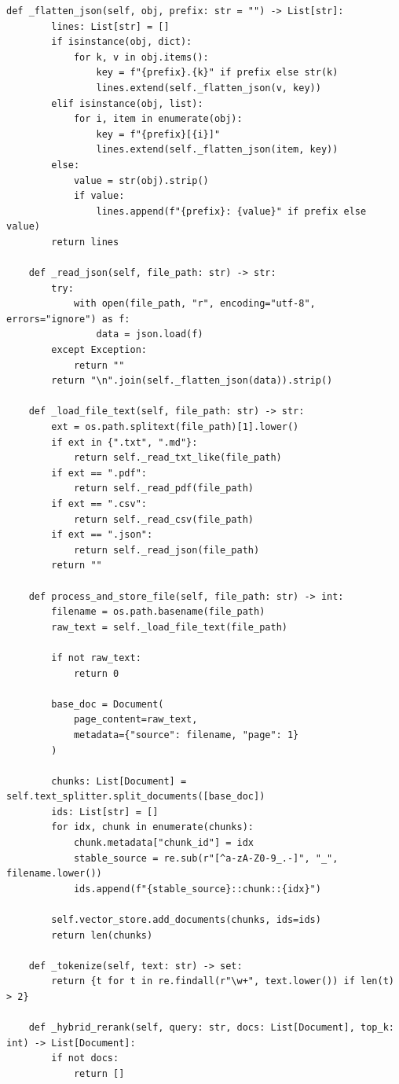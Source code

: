 \documentclass[12pt,a4paper]{article}
\begin{document}
\begin{lstlisting}[caption={database.py}]
    def _flatten_json(self, obj, prefix: str = "") -> List[str]:
        lines: List[str] = []
        if isinstance(obj, dict):
            for k, v in obj.items():
                key = f"{prefix}.{k}" if prefix else str(k)
                lines.extend(self._flatten_json(v, key))
        elif isinstance(obj, list):
            for i, item in enumerate(obj):
                key = f"{prefix}[{i}]"
                lines.extend(self._flatten_json(item, key))
        else:
            value = str(obj).strip()
            if value:
                lines.append(f"{prefix}: {value}" if prefix else value)
        return lines

    def _read_json(self, file_path: str) -> str:
        try:
            with open(file_path, "r", encoding="utf-8", errors="ignore") as f:
                data = json.load(f)
        except Exception:
            return ""
        return "\n".join(self._flatten_json(data)).strip()

    def _load_file_text(self, file_path: str) -> str:
        ext = os.path.splitext(file_path)[1].lower()
        if ext in {".txt", ".md"}:
            return self._read_txt_like(file_path)
        if ext == ".pdf":
            return self._read_pdf(file_path)
        if ext == ".csv":
            return self._read_csv(file_path)
        if ext == ".json":
            return self._read_json(file_path)
        return ""

    def process_and_store_file(self, file_path: str) -> int:
        filename = os.path.basename(file_path)
        raw_text = self._load_file_text(file_path)

        if not raw_text:
            return 0

        base_doc = Document(
            page_content=raw_text,
            metadata={"source": filename, "page": 1}
        )

        chunks: List[Document] = self.text_splitter.split_documents([base_doc])
        ids: List[str] = []
        for idx, chunk in enumerate(chunks):
            chunk.metadata["chunk_id"] = idx
            stable_source = re.sub(r"[^a-zA-Z0-9_.-]", "_", filename.lower())
            ids.append(f"{stable_source}::chunk::{idx}")

        self.vector_store.add_documents(chunks, ids=ids)
        return len(chunks)

    def _tokenize(self, text: str) -> set:
        return {t for t in re.findall(r"\w+", text.lower()) if len(t) > 2}

    def _hybrid_rerank(self, query: str, docs: List[Document], top_k: int) -> List[Document]:
        if not docs:
            return []


\end{lstlisting}
\end{document}

